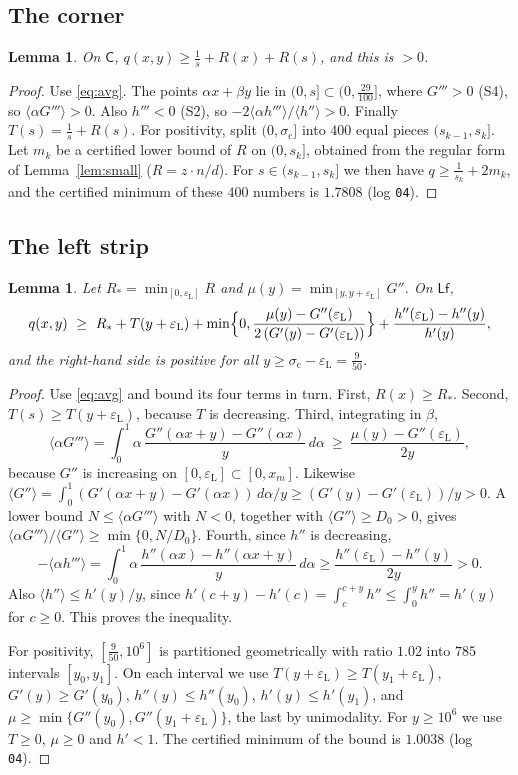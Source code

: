 \documentclass[11pt,a4paper]{article}
\newtheorem{lemma}[theorem]{Lemma}
\theoremstyle{definition}
\theoremstyle{remark}
\newcommand{\av}[1]{\langle #1\rangle}
\newcommand{\sig}{\sigma_{\mathrm c}}
\newcommand{\eL}{\varepsilon_{\mathrm L}}
\begin{document}
\subsection{The corner}
\begin{lemma}\label{lem:corner}
On $\mathsf C$, $q(x,y)\ge\frac1s+R(x)+R(s)$, and this is $>0$.
\end{lemma}
\begin{proof}
Use \eqref{eq:avg}. The points $\alpha x+\beta y$ lie in $(0,s]\subset(0,\frac{29}{100}]$, where $G'''>0$ (S4), so $\av{\alpha G'''}>0$. Also $h'''<0$ (S2), so $-2\av{\alpha h'''}/\av{h''}>0$. Finally $T(s)=\frac1s+R(s)$. For positivity, split $(0,\sig]$ into $400$ equal pieces $(s_{k-1},s_k]$. Let $m_k$ be a certified lower bound of $R$ on $(0,s_k]$, obtained from the regular form of Lemma~\ref{lem:small} ($R=z\cdot n/d$). For $s\in(s_{k-1},s_k]$ we then have $q\ge\frac1{s_k}+2m_k$, and the certified minimum of these $400$ numbers is $1.7808$ (log \texttt{04}).
\end{proof}

\subsection{The left strip}
\begin{lemma}\label{lem:left}
Let $R_*=\min_{[0,\eL]}R$ and $\mu(y)=\min_{[y,y+\eL]}G''$. On $\mathsf{Lf}$,
\[
q(x,y)\ \ge\ R_*+T(y+\eL)+\min\Bigl\{0,\frac{\mu(y)-G''(\eL)}{2\,(G'(y)-G'(\eL))}\Bigr\}+\frac{h''(\eL)-h''(y)}{h'(y)},
\]
and the right-hand side is positive for all $y\ge\sig-\eL=\frac9{50}$.
\end{lemma}
\begin{proof}
Use \eqref{eq:avg} and bound its four terms in turn. First, $R(x)\ge R_*$. Second, $T(s)\ge T(y+\eL)$, because $T$ is decreasing. Third, integrating in $\beta$,
\[
\av{\alpha G'''}=\int_0^1\alpha\,\frac{G''(\alpha x+y)-G''(\alpha x)}{y}\,d\alpha\ \ge\ \frac{\mu(y)-G''(\eL)}{2y},
\]
because $G''$ is increasing on $[0,\eL]\subset[0,x_m]$. Likewise $\av{G''}=\int_0^1(G'(\alpha x+y)-G'(\alpha x))\,d\alpha/y\ge(G'(y)-G'(\eL))/y>0$. A lower bound $N\le\av{\alpha G'''}$ with $N<0$, together with $\av{G''}\ge D_0>0$, gives $\av{\alpha G'''}/\av{G''}\ge\min\{0,N/D_0\}$. Fourth, since $h''$ is decreasing,
\[
-\av{\alpha h'''}=\int_0^1\alpha\,\frac{h''(\alpha x)-h''(\alpha x+y)}{y}\,d\alpha\ge\frac{h''(\eL)-h''(y)}{2y}>0 .
\]
Also $\av{h''}\le h'(y)/y$, since $h'(c+y)-h'(c)=\int_c^{c+y}h''\le\int_0^yh''=h'(y)$ for $c\ge0$. This proves the inequality.

For positivity, $[\frac9{50},10^6]$ is partitioned geometrically with ratio $1.02$ into $785$ intervals $[y_0,y_1]$. On each interval we use $T(y+\eL)\ge T(y_1+\eL)$, $G'(y)\ge G'(y_0)$, $h''(y)\le h''(y_0)$, $h'(y)\le h'(y_1)$, and $\mu\ge\min\{G''(y_0),G''(y_1+\eL)\}$, the last by unimodality. For $y\ge10^6$ we use $T\ge0$, $\mu\ge0$ and $h'<1$. The certified minimum of the bound is $1.0038$ (log \texttt{04}).
\end{proof}
\end{document}
